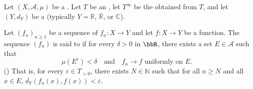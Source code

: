 \begin{definition} \label{definition:almost_uniform_convergence_of_a_sequence_of_measurable_functions_from_a_measure_space_to_a_metric_space}
Let $(X, \mathcal{A}, \mu)$ be a . Let $T$ be an , let $T^\infty$ be the  obtained from $T$, and let $(Y, d_Y)$ be a  (typically $Y = \mathbb{R}$, $\overline{\mathbb{R}}$, or $\mathbb{C}$).

Let $(f_n)_{n \geq 1}$ be a sequence of  $f_n : X \to Y$ and let $f : X \to Y$ be a function. The sequence $(f_n)$ is said to  if for every $\delta > 0$ in $\bbR$, there exists a set $E \in \mathcal{A}$ such that
$$\mu(E^c) < \delta \quad \text{and} \quad f_n \to f \text{ uniformly on } E.$$
()
That is, for every $\varepsilon \in T_{>0}$, there exists $N \in \mathbb{N}$ such that for all $n \geq N$ and all $x \in E$, $d_Y(f_n(x), f(x)) < \varepsilon$.
\end{definition}